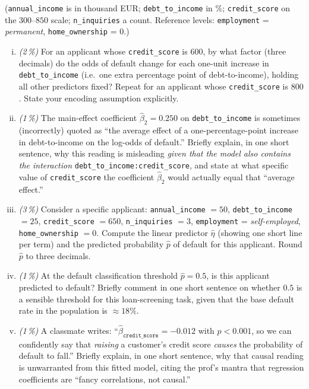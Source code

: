 \documentclass[11pt,a4paper]{article}
\newcommand{\subpoints}[1]{\textit{(#1\,\%)}}
\begin{document}
\noindent (\texttt{annual\_income} is in thousand EUR; \texttt{debt\_to\_income} in $\%$; \texttt{credit\_score} on the $300$--$850$ scale; \texttt{n\_inquiries} a count. Reference levels: \texttt{employment} = \emph{permanent}, \texttt{home\_ownership} = $0$.)

\begin{enumerate}[(i)]
  \item \subpoints{2} For an applicant whose \texttt{credit\_score} is $600$, by what factor (three decimals) do the odds of default change for each one-unit increase in \texttt{debt\_to\_income} (i.e.\ one extra percentage point of debt-to-income), holding all other predictors fixed? Repeat for an applicant whose \texttt{credit\_score} is $800$. State your encoding assumption explicitly.

  \item \subpoints{1} The main-effect coefficient $\hat\beta_2 = 0.250$ on \texttt{debt\_to\_income} is sometimes (incorrectly) quoted as ``the average effect of a one-percentage-point increase in debt-to-income on the log-odds of default.'' Briefly explain, in one short sentence, why this reading is misleading \emph{given that the model also contains the interaction} \texttt{debt\_to\_income:credit\_score}, and state at what specific value of \texttt{credit\_score} the coefficient $\hat\beta_2$ would actually equal that ``average effect.''

  \item \subpoints{3} Consider a specific applicant: \texttt{annual\_income} $= 50$, \texttt{debt\_to\_income} $= 25$, \texttt{credit\_score} $= 650$, \texttt{n\_inquiries} $= 3$, \texttt{employment} = \emph{self-employed}, \texttt{home\_ownership} $= 0$. Compute the linear predictor $\hat\eta$ (showing one short line per term) and the predicted probability $\hat p$ of default for this applicant. Round $\hat p$ to three decimals.

  \item \subpoints{1} At the default classification threshold $\hat p = 0.5$, is this applicant predicted to default? Briefly comment in one short sentence on whether $0.5$ is a sensible threshold for this loan-screening task, given that the base default rate in the population is $\approx 18\%$.

  \item \subpoints{1} A classmate writes: ``$\hat\beta_{\texttt{credit\_score}} = -0.012$ with $p < 0.001$, so we can confidently say that \emph{raising} a customer's credit score \emph{causes} the probability of default to fall.'' Briefly explain, in one short sentence, why that causal reading is unwarranted from this fitted model, citing the prof's mantra that regression coefficients are ``fancy correlations, not causal.''


\end{enumerate}
\end{document}

